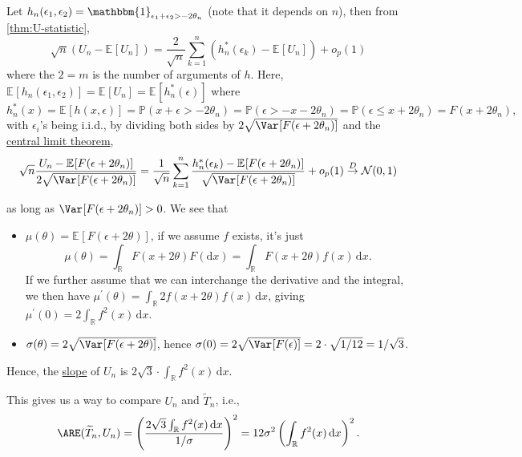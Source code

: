 \begin{explanation}
	Let \(h_n(\epsilon _1, \epsilon _2) = \mathbbm{1}_{\epsilon _1 + \epsilon _2 > - 2 \theta _n} \) (note that it depends on \(n\)), then from \autoref{thm:U-statistic},
	\[
		\sqrt{n} \left( U_n - \mathbb{E}_{}[U_n] \right)
		= \frac{2}{\sqrt{n} } \sum_{k=1}^{n} \left( h^{\ast} _n(\epsilon _k) - \mathbb{E}_{}[U_n] \right) + o_p(1)
	\]
	where the \(2 = m\) is the number of arguments of \(h\). Here, \(\mathbb{E}_{}[h_n(\epsilon _1, \epsilon _2)] = \mathbb{E}_{}[U_n] = \mathbb{E}_{}[h^{\ast} _n (\epsilon )] \) where
	\[
		h^{\ast} _n(x)
		= \mathbb{E}_{}[h(x, \epsilon )]
		= \mathbb{P} (x + \epsilon > - 2\theta _n)
		= \mathbb{P} (\epsilon > -x - 2\theta _n)
		= \mathbb{P} (\epsilon \leq x + 2 \theta _n)
		= F(x + 2 \theta _n),
	\]
	with \(\epsilon _i\)'s being i.i.d., by dividing both sides by \(2 \sqrt{\Var_{}[F(\epsilon + 2 \theta _n)] } \) and the \hyperref[thm:CLT]{central limit theorem},
	\[
		\sqrt{n} \frac{U_n - \mathbb{E}_{}[F(\epsilon + 2 \theta _n)] }{2 \sqrt{\Var_{}[F(\epsilon + 2 \theta _n)] } }
		= \frac{1}{\sqrt{n} } \sum_{k=1}^{n} \frac{h^{\ast} _n(\epsilon _k) - \mathbb{E}_{}[F(\epsilon + 2 \theta _n)] }{\sqrt{\Var_{}[F(\epsilon + 2 \theta _n)] } } + o_p(1)
		\overset{D}{\to} \mathcal{N} (0, 1)
	\]

	as long as \(\Var_{}[F(\epsilon + 2 \theta _n)] > 0\). We see that
	\begin{itemize}
		\item \(\mu (\theta ) = \mathbb{E}_{}[F(\epsilon + 2 \theta )] \), if we assume \(f\) exists, it's just
		      \[
			      \mu (\theta ) = \int_{\mathbb{R} } F(x + 2 \theta ) F(\mathrm{d} x)
			      = \int_{\mathbb{R} } F(x + 2 \theta ) f(x) \,\mathrm{d} x.
		      \]
		      If we further assume that we can interchange the derivative and the integral, we then have \(\mu ^{\prime} (\theta ) = \int_{\mathbb{R} } 2 f(x + 2\theta ) f(x) \,\mathrm{d} x\), giving \(\mu ^{\prime} (0) = 2 \int_{\mathbb{R}} f^2(x) \,\mathrm{d} x\).
		\item \(\sigma (\theta ) = 2 \sqrt{\Var_{}[F(\epsilon + 2 \theta )] } \), hence \(\sigma (0) = 2 \sqrt{\Var_{}[F(\epsilon )]} = 2 \cdot \sqrt{1 / 12} = 1 / \sqrt{3}  \).
	\end{itemize}
	Hence, the \hyperref[def:slope]{slope} of \(U_n\) is \(2 \sqrt{3} \cdot \int_{\mathbb{R}} f^2(x) \,\mathrm{d} x\).
\end{explanation}

This gives us a way to compare \(U_n\) and \(\widetilde{T} _n\), i.e.,
\[
	\ARE(\widetilde{T} _n, U_n)
	= \left( \frac{2 \sqrt{3} \int_{\mathbb{R} } f^2(x)\,\mathrm{d} x}{1 / \sigma } \right) ^2
	= 12 \sigma ^2 \left( \int_{\mathbb{R} } f^2(x) \,\mathrm{d} x \right) ^2.
\]